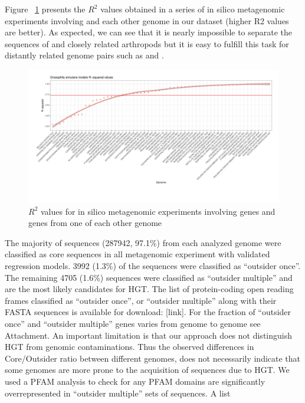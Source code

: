 Figure ~\ref{fig:rsquared_curve} presents the $R^2$ values obtained in a series
of in silico metagenomic experiments involving  and
each other genome in our dataset (higher R2 values are better). As expected, we
can see that it is nearly impossible to separate the sequences of
 and closely related arthropods but it is easy to fulfill
this task for distantly related genome pairs such as  and
.
\begin{center}
\begin{figure}
\includegraphics[width=12cm]{figures/rsq_drosoph_bootstrapped.pdf}
\caption{$R^2$ values for in silico metagenomic experiments involving
 genes and genes from one of each other genome}
\label{fig:rsquared_curve}
\end{figure}
\end{center}
The majority of sequences (287942, 97.1\%) from each analyzed genome were
classified as core sequences in all metagenomic experiment with validated
regression models. 3992 (1.3\%) of the sequences were classified as “outsider
once”. The remaining 4705 (1.6\%) sequences were classified as “outsider
multiple” and are the most likely candidates for HGT. The list of
protein-coding open reading frames classified as “outsider once”, or “outsider
multiple” along with their FASTA sequences is available for download: [link].
For the fraction of “outsider once” and “outsider multiple” genes varies from
genome to genome see Attachment. An important limitation is that our approach
does not distinguish HGT from genomic contaminations. Thus the observed
differences in Core/Outsider ratio between different genomes, does not
necessarily indicate that some genomes are more prone to the acquisition of
sequences due to HGT. We used a PFAM analysis to check for any PFAM domains are
significantly overrepresented in “outsider multiple” sets of sequences. A list

